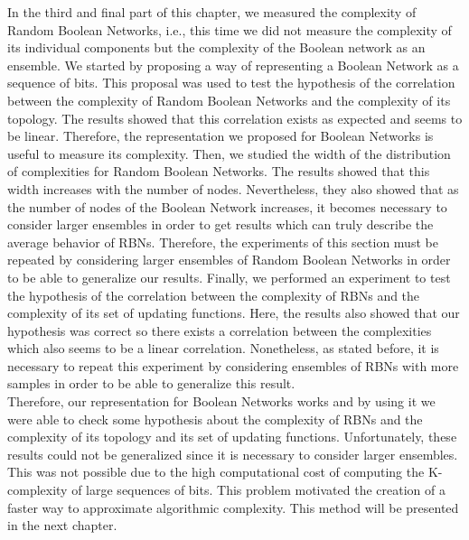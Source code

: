 In the third and final part of this chapter, we measured the complexity of Random Boolean Networks, i.e., this time we did not measure the complexity of its individual components but the complexity of the Boolean network as an ensemble. We started by proposing a way of representing a Boolean Network as a sequence of bits. This proposal was used to test the hypothesis of the correlation between the complexity of Random Boolean Networks and the complexity of its topology. The results showed that this correlation exists as expected and seems to be linear. Therefore, the representation we proposed for Boolean Networks is useful to measure its complexity. Then, we studied the width of the distribution of complexities for Random Boolean Networks. The results showed that this width increases with the number of nodes. Nevertheless, they also showed that as the number of nodes of the Boolean Network increases, it becomes necessary to consider larger ensembles in order to get results which can truly describe the average behavior of RBNs. Therefore, the experiments of this section must be repeated by considering larger ensembles of Random Boolean Networks in order to be able to generalize our results. Finally, we performed an experiment to test the hypothesis of the correlation between the complexity of RBNs and the complexity of its set of updating functions. Here, the results also showed that our hypothesis was correct so there exists a correlation between the complexities which also seems to be a linear correlation. Nonetheless, as stated before, it is necessary to repeat this experiment by considering ensembles of RBNs with more samples in order to be able to generalize this result.\\

Therefore, our representation for Boolean Networks works and by using it we were able to check some hypothesis about the complexity of RBNs and the complexity of its topology and its set of updating functions. Unfortunately, these results could not be generalized since it is necessary to consider larger ensembles. This was not possible due to the high computational cost of computing the K-complexity of large sequences of bits. This problem motivated the creation of a faster way to approximate algorithmic complexity. This method will be presented in the next chapter.


